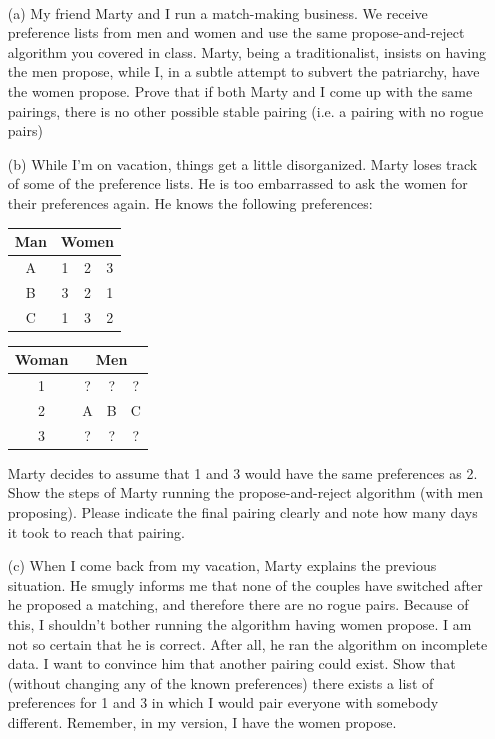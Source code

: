 \documentclass[11pt]{article}
\begin{document}
\begin{qunlist}
 \\ 

\begin{itemize}
\item[(a)] My friend Marty and I run a match-making business. We receive preference lists from men and women and use the same propose-and-reject algorithm you covered in class. Marty, being a traditionalist, insists on having the men propose, while I, in a subtle attempt to subvert the patriarchy, have the women propose. Prove that if both Marty and I come up with the same pairings, there is no other possible stable pairing (i.e. a pairing with no rogue pairs)

\item[(b)] While I'm on vacation, things get a little disorganized. Marty loses track of some of the preference lists. He is too embarrassed to ask the women for their preferences again. He knows the following preferences:

\begin{center}
\begin{tabular}{|c|ccc|}\hline 
Man&\multicolumn{3}{|c|}{Women}\\\hline 
A&1&2&3\\\hline 
B&3&2&1\\\hline 
C&1&3&2\\\hline
\end{tabular} 
\hspace{2cm}
\begin{tabular}{|c|ccc|}\hline 
Woman&\multicolumn{3}{|c|}{Men}\\\hline 
1&?&?&?\\\hline 
2&A&B&C\\\hline 
3&?&?&?\\\hline
\end{tabular}
\end{center}
   
   Marty decides to assume that 1 and 3 would have the same preferences as 2. Show the steps of Marty running the propose-and-reject algorithm (with men proposing). Please indicate the final pairing clearly and note how many days it took to reach that pairing.

\item[(c)] When I come back from my vacation, Marty explains the previous situation. He smugly informs me that none of the couples have switched after he proposed a matching, and therefore there are no rogue pairs. Because of this, I shouldn't bother running the algorithm having women propose. I am not so certain that he is correct. After all, he ran the algorithm on incomplete data. I want to convince him that another pairing could exist. Show that (without changing any of the known preferences) there exists a list of preferences for 1 and 3 in which I would pair everyone with somebody different. Remember, in my version, I have the women propose.


\end{itemize}
\end{qunlist}
\end{document}
